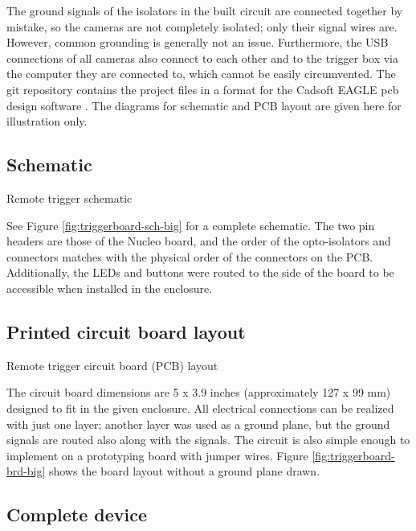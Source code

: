 The ground signals of the isolators in the built circuit are connected together by mistake, so the cameras are not completely isolated; only their signal wires are.
However, common grounding is generally not an issue.
Furthermore, the USB connections of all cameras also connect to each other and to the trigger box via the computer they are connected to, which cannot be easily circumvented.
The git repository contains the project files in a format for the Cadsoft EAGLE pcb design software \cite{eaglepcb}.
The diagrams for schematic and PCB layout are given here for illustration only.

\subsection{Schematic} \label{app:fullschematic}

{Remote trigger schematic}

See Figure \ref{fig:triggerboard-sch-big} for a complete schematic.
The two pin headers are those of the Nucleo board, and the order of the opto-isolators and connectors matches with the physical order of the connectors on the PCB.
Additionally, the LEDs and buttons were routed to the side of the board to be accessible when installed in the enclosure.

\subsection{Printed circuit board layout}

{Remote trigger circuit board (PCB) layout}

The circuit board dimensions are 5 x 3.9 inches (approximately 127 x 99 mm) designed to fit in the given enclosure.
All electrical connections can be realized with just one layer;
another layer was used as a ground plane, but the ground signals are routed also along with the signals.
The circuit is also simple enough to implement on a prototyping board with jumper wires.
Figure \ref{fig:triggerboard-brd-big} shows the board layout without a ground plane drawn.

\subsection{Complete device}

